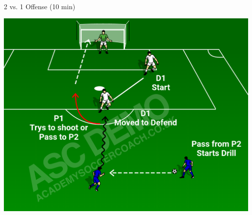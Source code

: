 \begin{evenBlock}{2 vs. 1 Offense (10 min)}


\begin{minipage}[t]{\linewidth}
    \centering
    
    \begin{minipage}{.3\linewidth} %
            \includegraphics[width=\textwidth]{../img/Trimmed/2v1_Option}

            \vspace{3pt}
            

\end{minipage}
\end{minipage}
\end{evenBlock}
